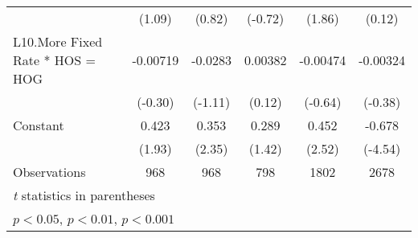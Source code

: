 {\begin{longtable}{l*{5}{c}}
                &   (1.09)         &   (0.82)         &  (-0.72)         &   (1.86)         &   (0.12)         \\
\addlinespace
L10.More Fixed Rate * HOS = HOG& -0.00719         &  -0.0283         &  0.00382         & -0.00474         & -0.00324         \\
                &  (-0.30)         &  (-1.11)         &   (0.12)         &  (-0.64)         &  (-0.38)         \\
\addlinespace
Constant        &    0.423         &    0.353\sym{*}  &    0.289         &    0.452\sym{*}  &   -0.678\sym{***}\\
                &   (1.93)         &   (2.35)         &   (1.42)         &   (2.52)         &  (-4.54)         \\
\midrule
Observations    &      968         &      968         &      798         &     1802         &     2678         \\
\bottomrule
\multicolumn{6}{l}{\footnotesize \textit{t} statistics in parentheses}\\
\multicolumn{6}{l}{\footnotesize \sym{*} \(p<0.05\), \sym{**} \(p<0.01\), \sym{***} \(p<0.001\)}\\
\end{longtable}
}
